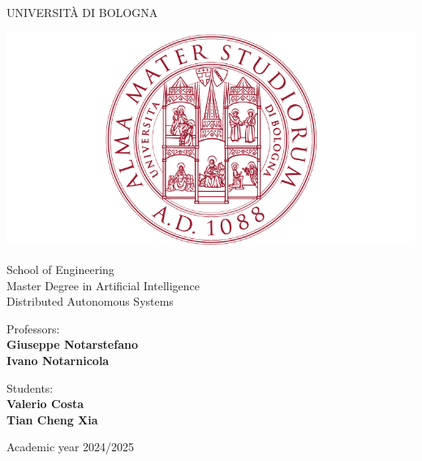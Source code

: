 \documentclass[a4paper,11pt,oneside]{book}
\begin{document}
\pagestyle{myheadings}

\def\N{{\mathbb{N}}}
\def\R{{\mathbb{R}}}
\def\z{{\bm{z}}}
\def\Q{{\bm{Q}}}
\def\r{{\bm{r}}}
\def\p{{\bm{p}}}


\thispagestyle{empty}                                                 
\begin{center}                                                            
    \vspace{5mm}
    {\LARGE UNIVERSIT\`A DI BOLOGNA} \\                       
      \vspace{5mm}
\end{center}
\begin{center}
  \includegraphics[scale=.27]{figs/logo_unibo}
\end{center}
\begin{center}
      \vspace{5mm}
      {\LARGE School of Engineering} \\
        \vspace{3mm}
      {\Large Master Degree in Artificial Intelligence} \\
      \vspace{20mm}
      {\LARGE Distributed Autonomous Systems} \\
      \vspace{15mm}
\end{center}
\begin{minipage}{0.48\linewidth}
      \raggedright
     {\large Professors:}\\
     \textbf{Giuseppe Notarstefano} \\
     \textbf{Ivano Notarnicola} \\        
\end{minipage}
\begin{minipage}{0.48\linewidth}
      \raggedleft
      {\large Students:}\\
      \textbf{\@ Valerio Costa} \\
      \textbf{\@ Tian Cheng Xia} \\  
\end{minipage}
\begin{center}
\vfill
      {\large Academic year \@2024/2025} \\
\end{center}
\end{document}
